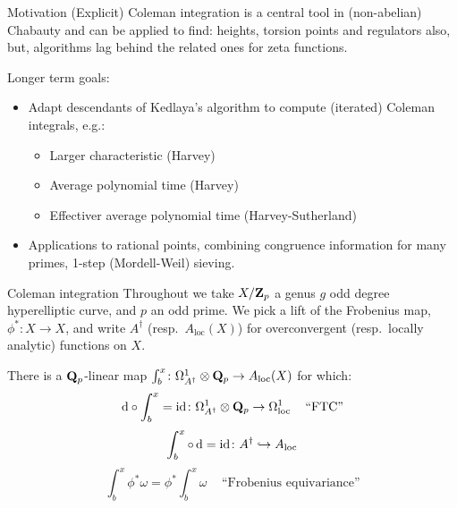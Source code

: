 \begin{frame}{Motivation}
    (Explicit) Coleman integration is a central tool in (non-abelian) Chabauty and can be applied to find: heights, torsion points and  regulators also, but, algorithms lag behind the related ones for zeta functions.
    \pause%

    Longer term goals:
    \begin{itemize}[<+->]
        \item Adapt descendants of Kedlaya's algorithm to compute (iterated) Coleman integrals, e.g.:
            \begin{itemize}[<+->]
                \item Larger characteristic (Harvey)
                \item Average polynomial time (Harvey)
                \item Effectiver average polynomial time (Harvey-Sutherland)
            \end{itemize}
        \item Applications to rational points, combining congruence information for many primes, 1-step (Mordell-Weil) sieving.
    \end{itemize}
\end{frame}


\begin{frame}{Coleman integration}
    Throughout we take \(X/\mathbf{Z}_p\) a genus \(g\) odd degree hyperelliptic curve, and \(p\) an odd prime.
    We pick a lift of the Frobenius map, \(\phi^*\colon X \to X\), and write \(A^\dagger\) (resp.\ \(A_{\text{loc}}(X)\)) for overconvergent (resp.\ locally analytic) functions on \(X\).
    \pause%
    \begin{theorem}[{Coleman}]\label{thm-coleman-harvey-int}
        \hypertarget{p-2914}{}%
        There is a \(\mathbf{Q}_p\)-linear map \(\int_b^x\colon \Omega_{A^\dagger}^1\otimes \mathbf{Q}_p \to A_\mathrm{loc} (X)\) for which:\leavevmode%
        \[\mathop{}\!\mathrm{d} \circ \int_b^x = \mathrm{id}\colon \Omega_{A^\dagger}^1\otimes \mathbf{Q}_p \to \Omega_{\text{loc}}^1\,\quad\text{``FTC''}\]%
        \[\int_b^x\circ\mathop{}\!\mathrm{d} = \mathrm{id}\colon A^\dagger \hookrightarrow A_{\mathrm{loc}}\]%
        \[\int_b^x \phi^*\omega = \phi^*\int_b^x \omega\,\quad\text{``Frobenius equivariance''}\]%
    \end{theorem}
\end{frame}


